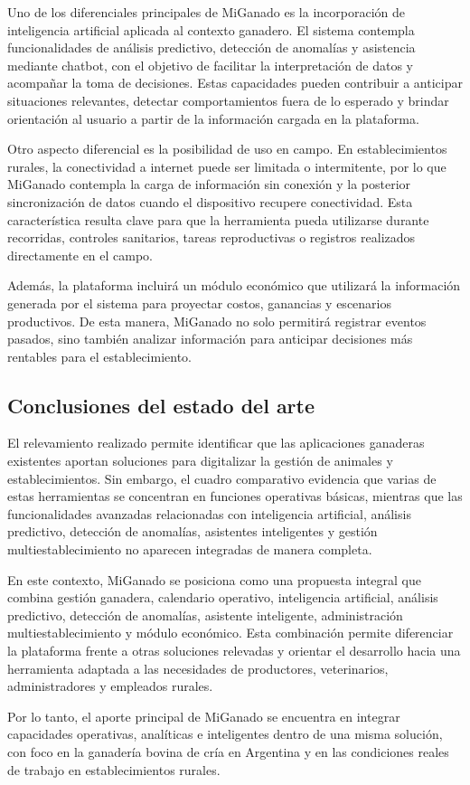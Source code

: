 Uno de los diferenciales principales de MiGanado es la incorporaci\'on de inteligencia artificial aplicada al contexto ganadero. El sistema contempla funcionalidades de an\'alisis predictivo, detecci\'on de anomal\'ias y asistencia mediante chatbot, con el objetivo de facilitar la interpretaci\'on de datos y acompa\~nar la toma de decisiones. Estas capacidades pueden contribuir a anticipar situaciones relevantes, detectar comportamientos fuera de lo esperado y brindar orientaci\'on al usuario a partir de la informaci\'on cargada en la plataforma.

Otro aspecto diferencial es la posibilidad de uso en campo. En establecimientos rurales, la conectividad a internet puede ser limitada o intermitente, por lo que MiGanado contempla la carga de informaci\'on sin conexi\'on y la posterior sincronizaci\'on de datos cuando el dispositivo recupere conectividad. Esta caracter\'istica resulta clave para que la herramienta pueda utilizarse durante recorridas, controles sanitarios, tareas reproductivas o registros realizados directamente en el campo.

Adem\'as, la plataforma incluir\'a un m\'odulo econ\'omico que utilizar\'a la informaci\'on generada por el sistema para proyectar costos, ganancias y escenarios productivos. De esta manera, MiGanado no solo permitir\'a registrar eventos pasados, sino tambi\'en analizar informaci\'on para anticipar decisiones m\'as rentables para el establecimiento.

\subsection{Conclusiones del estado del arte}

El relevamiento realizado permite identificar que las aplicaciones ganaderas existentes aportan soluciones para digitalizar la gesti\'on de animales y establecimientos. Sin embargo, el cuadro comparativo evidencia que varias de estas herramientas se concentran en funciones operativas b\'asicas, mientras que las funcionalidades avanzadas relacionadas con inteligencia artificial, an\'alisis predictivo, detecci\'on de anomal\'ias, asistentes inteligentes y gesti\'on multiestablecimiento no aparecen integradas de manera completa.

En este contexto, MiGanado se posiciona como una propuesta integral que combina gesti\'on ganadera, calendario operativo, inteligencia artificial, an\'alisis predictivo, detecci\'on de anomal\'ias, asistente inteligente, administraci\'on multiestablecimiento y m\'odulo econ\'omico. Esta combinaci\'on permite diferenciar la plataforma frente a otras soluciones relevadas y orientar el desarrollo hacia una herramienta adaptada a las necesidades de productores, veterinarios, administradores y empleados rurales.

Por lo tanto, el aporte principal de MiGanado se encuentra en integrar capacidades operativas, anal\'iticas e inteligentes dentro de una misma soluci\'on, con foco en la ganader\'ia bovina de cr\'ia en Argentina y en las condiciones reales de trabajo en establecimientos rurales.


\FloatBarrier
